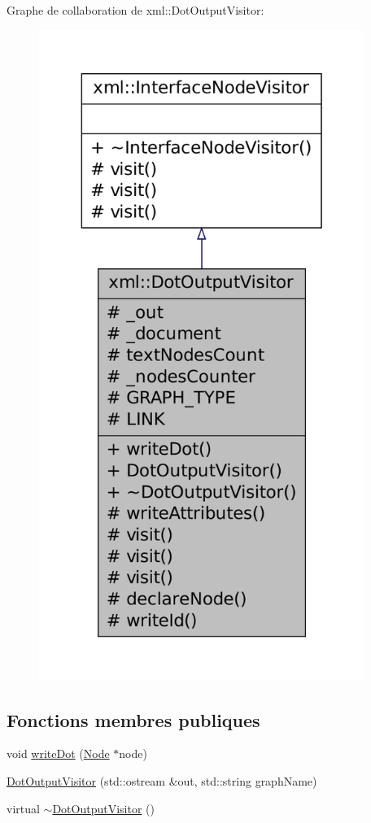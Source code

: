 Graphe de collaboration de xml::DotOutputVisitor:
\nopagebreak
\begin{figure}[H]
\begin{center}
\leavevmode
\includegraphics[height=600pt]{classxml_1_1_dot_output_visitor__coll__graph}
\end{center}
\end{figure}
\subsection*{Fonctions membres publiques}
\begin{DoxyCompactItemize}
\item 
void \hyperlink{classxml_1_1_dot_output_visitor_a329cc7e31f291ccbebf5029325321ee0}{writeDot} (\hyperlink{classxml_1_1_node}{Node} $\ast$node)
\item 
\hyperlink{classxml_1_1_dot_output_visitor_a572e83719b4820a194c8094fd283caea}{DotOutputVisitor} (std::ostream \&out, std::string graphName)
\item 
virtual \hyperlink{classxml_1_1_dot_output_visitor_a58f12e15968fb6d1d66853b8106212fe}{$\sim$DotOutputVisitor} ()
\end{DoxyCompactItemize}
